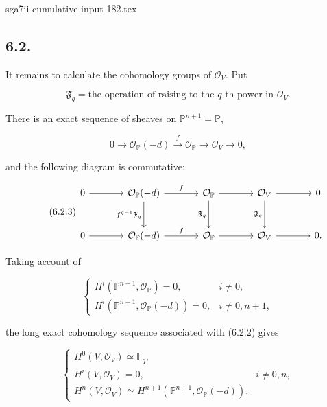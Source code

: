 \begin{filecontents*}{sga7ii-cumulative-input-182.tex}
\subsection*{6.2.}
It remains to calculate the cohomology groups of $\mathcal O_V$.
Put

\begin{equation}\tag{6.2.1}
\mathfrak F_q
=\text{the operation of raising to the $q$-th power in $\mathcal O_V$}.
\end{equation}

There is an exact sequence of sheaves on
$\mathbb P^{n+1}=\mathbb P$,

\begin{equation}\tag{6.2.2}
0\longrightarrow\mathcal O_{\mathbb P}(-d)
\xrightarrow{\,f\,}\mathcal O_{\mathbb P}
\longrightarrow\mathcal O_V\longrightarrow0,
\end{equation}

and the following diagram is commutative:

\begin{equation}\tag{6.2.3}
\begin{tikzcd}[column sep=large,row sep=large]
0 \arrow[r] &
\mathcal O_{\mathbb P}(-d) \arrow[r,"f"] \arrow[d,"f^{q-1}\mathfrak F_q"'] &
\mathcal O_{\mathbb P} \arrow[r] \arrow[d,"\mathfrak F_q"'] &
\mathcal O_V \arrow[r] \arrow[d,"\mathfrak F_q"'] &
0\\
0 \arrow[r] &
\mathcal O_{\mathbb P}(-d) \arrow[r,"f"] &
\mathcal O_{\mathbb P} \arrow[r] &
\mathcal O_V \arrow[r] &
0 .
\end{tikzcd}
\end{equation}

Taking account of

\begin{equation}\tag{6.2.4}
\begin{cases}
H^i(\mathbb P^{n+1},\mathcal O_{\mathbb P})=0,
&i\ne0,\\
H^i(\mathbb P^{n+1},\mathcal O_{\mathbb P}(-d))=0,
&i\ne0,n+1,
\end{cases}
\end{equation}

the long exact cohomology sequence associated with (6.2.2) gives

\begin{equation}\tag{6.2.5}
\begin{cases}
H^0(V,\mathcal O_V)\simeq\mathbb F_q,\\
H^i(V,\mathcal O_V)=0,&i\ne0,n,\\
H^n(V,\mathcal O_V)
\simeq H^{n+1}(\mathbb P^{n+1},\mathcal O_{\mathbb P}(-d)).
\end{cases}
\end{equation}


\end{filecontents*}
